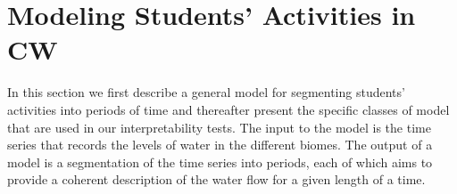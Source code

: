 \documentclass[letterpaper]{article} %
\begin{document}


\section{Modeling Students' Activities in CW}
\label{sec:model_for_segmenting_time}

In this section we first describe a general model for segmenting students' activities into periods of time and thereafter present the specific classes of model that are used in our interpretability tests.
The input to the model is the time series that records the levels of water in the different biomes.  The output of a model is a segmentation of the time series   into periods, each of which aims to provide a coherent description of the water flow for a given length of a time.

\end{document}

